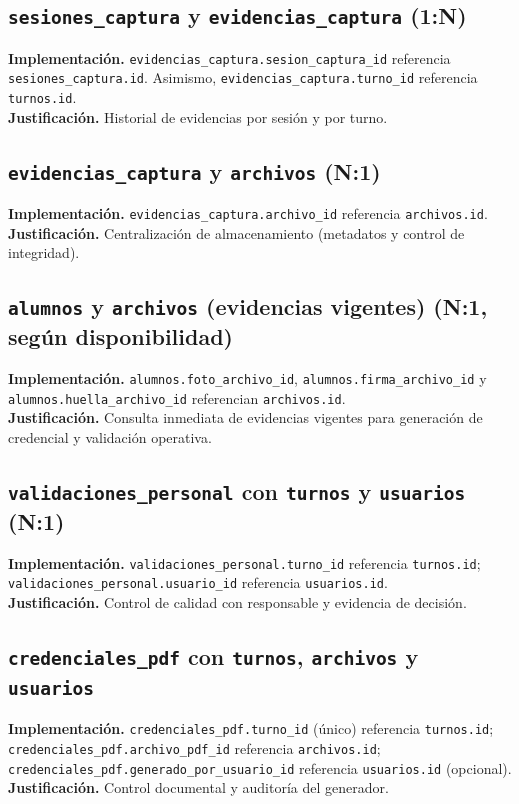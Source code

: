 \documentclass[12pt,a4paper]{article}
\begin{document}
\subsection{\texttt{sesiones\_captura} y \texttt{evidencias\_captura} (1:N)}
\textbf{Implementación.} \texttt{evidencias\_captura.sesion\_captura\_id} referencia \texttt{sesiones\_captura.id}. Asimismo, \texttt{evidencias\_captura.turno\_id} referencia \texttt{turnos.id}.\\
\textbf{Justificación.} Historial de evidencias por sesión y por turno.

\subsection{\texttt{evidencias\_captura} y \texttt{archivos} (N:1)}
\textbf{Implementación.} \texttt{evidencias\_captura.archivo\_id} referencia \texttt{archivos.id}.\\
\textbf{Justificación.} Centralización de almacenamiento (metadatos y control de integridad).

\subsection{\texttt{alumnos} y \texttt{archivos} (evidencias vigentes) (N:1, según disponibilidad)}
\textbf{Implementación.} \texttt{alumnos.foto\_archivo\_id}, \texttt{alumnos.firma\_archivo\_id} y \texttt{alumnos.huella\_archivo\_id} referencian \texttt{archivos.id}.\\
\textbf{Justificación.} Consulta inmediata de evidencias vigentes para generación de credencial y validación operativa.

\subsection{\texttt{validaciones\_personal} con \texttt{turnos} y \texttt{usuarios} (N:1)}
\textbf{Implementación.} \texttt{validaciones\_personal.turno\_id} referencia \texttt{turnos.id}; \texttt{validaciones\_personal.usuario\_id} referencia \texttt{usuarios.id}.\\
\textbf{Justificación.} Control de calidad con responsable y evidencia de decisión.

\subsection{\texttt{credenciales\_pdf} con \texttt{turnos}, \texttt{archivos} y \texttt{usuarios}}
\textbf{Implementación.} \texttt{credenciales\_pdf.turno\_id} (único) referencia \texttt{turnos.id}; \texttt{credenciales\_pdf.archivo\_pdf\_id} referencia \texttt{archivos.id}; \texttt{credenciales\_pdf.generado\_por\_usuario\_id} referencia \texttt{usuarios.id} (opcional).\\
\textbf{Justificación.} Control documental y auditoría del generador.
\end{document}
